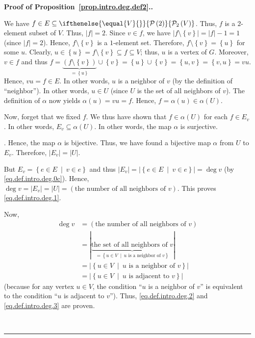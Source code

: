 \documentclass[numbers=enddot,12pt,final,onecolumn,notitlepage]{scrartcl}%
\theoremstyle{definition}
\newenvironment{proof}[1][Proof]{\noindent\textbf{#1.} }{\ \rule{0.5em}{0.5em}}
\newcommand{\powset}[2][]{\ifthenelse{\equal{#2}{}}{\mathcal{P}\left(#1\right)}{\mathcal{P}_{#1}\left(#2\right)}}
\newcommand{\set}[1]{\left\{ #1 \right\}}
\newcommand{\abs}[1]{\left| #1 \right|}
\newcommand{\tup}[1]{\left( #1 \right)}
\begin{document}
\begin{proof}[Proof of Proposition~\ref{prop.intro.deg.def2}.]
{We have $f \in E \subseteq \powset[2]{V}$. Thus, $f$ is a $2$-element
subset of $V$. Thus, $\abs{f} = 2$. Since $v \in f$, we have
$\abs{f \setminus \set{v}} = \abs{f} - 1 = 1$ (since $\abs{f} = 2$).
Hence, $f \setminus \set{v}$ is a $1$-element set. Therefore,
$f \setminus \set{v} = \set{u}$ for some $u$. Clearly,
$u \in \set{u} = f \setminus \set{v} \subseteq f \subseteq V$; thus,
$u$ is a vertex of $G$. Moreover, $v \in f$ and thus
$f = \underbrace{\tup{f \setminus \set{v}}}_{= \set{u}} \cup \set{v}
= \set{u} \cup \set{v} = \set{u, v} = \set{v, u} = vu$. Hence,
$vu = f \in E$. In other words, $u$ is a neighbor of $v$ (by the
definition of ``neighbor''). In other words, $u \in U$ (since $U$ is
the set of all neighbors of $v$). The definition of $\alpha$ now
yields $\alpha\tup{u} = vu = f$. Hence, $f = \alpha\tup{u} \in
\alpha\tup{U}$.

Now, forget that we fixed $f$. We thus have shown that
$f \in \alpha\tup{U}$ for each $f \in E_v$. In other words, $E_v
\subseteq \alpha\tup{U}$. In other words, the map $\alpha$ is
surjective.}. Hence, the map $\alpha$ is bijective. Thus, we have
found a bijective map $\alpha$ from $U$ to $E_v$. Therefore,
$\abs{E_v} = \abs{U}$.

But $E_v = \set{e \in E \ \mid \ v \in e }$ and thus
$\abs{E_v} = \abs{\set{e \in E \ \mid \ v \in e }} = \deg v$
(by \eqref{eq.def.intro.deg.0c}). Hence,
$\deg v = \abs{E_v} = \abs{U}
= \left(\text{the number of all neighbors of } v\right)$. This proves
\eqref{eq.def.intro.deg.1}.

Now,
\begin{align*}
\deg v &= \left(\text{the number of all neighbors of } v\right) \\
&= \abs{\underbrace{\text{the set of all neighbors of } v }_{
         = \set{u \in V \ \mid \ u \text{ is a neighbor of } v }}} \\
&= \abs{\set{u \in V \ \mid \ u \text{ is a neighbor of } v }} \\
&= \abs{\set{u \in V \ \mid \ u \text{ is adjacent to } v }}
\end{align*}
(because for any vertex $u \in V$, the condition
``$u$ is a neighbor of $v$'' is equivalent to the condition
``$u$ is adjacent to $v$''). Thus, \eqref{eq.def.intro.deg.2} and
\eqref{eq.def.intro.deg.3} are proven.


\end{proof}
\end{document}
